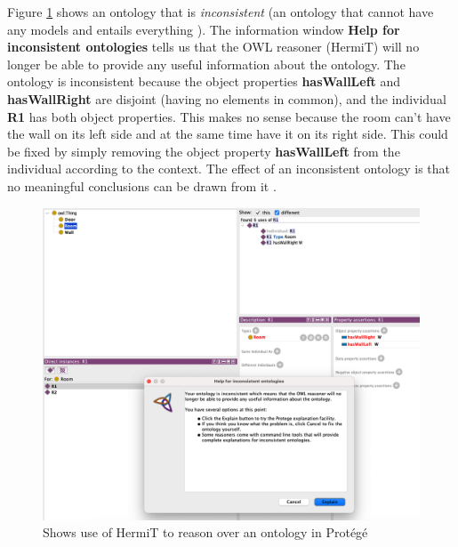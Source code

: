 \documentclass{article}
\begin{document}
Figure \ref{fig:hermit_in_protege} shows an ontology that is \emph{inconsistent} (an ontology that cannot have any models and entails everything \cite{horridge_explaining_2009, huang_reasoning_2004}). The information window \textbf{Help for inconsistent ontologies} tells us that the OWL reasoner (HermiT) will no longer be able to provide any useful information about the ontology. The ontology is inconsistent because the object properties \textbf{hasWallLeft} and \textbf{hasWallRight} are disjoint (having no elements in common), and the individual \textbf{R1} has both object properties. This makes no sense because the room can't have the wall on its left side and at the same time have it on its right side. This could be fixed by simply removing the object property \textbf{hasWallLeft} from the individual according to the context. The effect of an inconsistent ontology is that no meaningful conclusions can be drawn from it \cite{horridge_explaining_2009}.

\begin{figure}[H]
    \centering
    \includegraphics[scale=0.30]{graphics/screenshot_ontology.png}
    \caption{Shows use of HermiT to reason over an ontology in Protégé}
    \label{fig:hermit_in_protege}
\end{figure}
\end{document}
